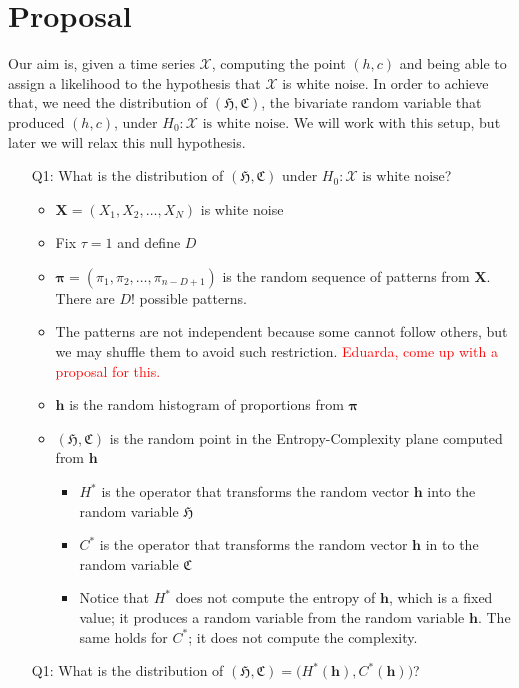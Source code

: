 \documentclass[12pt]{article}
\begin{document}
\section{Proposal}

Our aim is, given a time series $\mathcal X$, computing the point $(h,c)$ and being able to assign a likelihood to the hypothesis that $\mathcal X$ is white noise.
In order to achieve that, we need the distribution of $(\mathfrak{H},\mathfrak{C})$, the bivariate random  variable that produced $(h,c)$, under $H_0:\mathcal X\text { is white noise}$.
We will work with this setup, but later we will relax this null hypothesis.
%
\begin{itemize}
\item[Q1:] What is the distribution of $(\mathfrak{H},\mathfrak{C})$ under $H_0:\mathcal X\text { is white noise}$?
\begin{itemize}
	\item $\bm X = (X_1,X_2,\dots,X_N)$ is white noise
	\item Fix $\tau=1$ and define $D$
	\item $\bm \pi=(\pi_1,\pi_2,\dots,\pi_{n-D+1})$ is the random sequence of patterns from $\bm X$. There are $D!$ possible patterns.
	\item The patterns are not independent because some cannot follow others, but we may shuffle them to avoid such restriction. \textcolor{red}{Eduarda, come up with a proposal for this.}
	\item $\bm h$ is the random histogram of proportions from $\bm \pi$
	\item $(\mathfrak{H},\mathfrak{C})$ is the random point in the Entropy-Complexity plane computed from $\bm h$
	\begin{itemize}	
		\item $H^*$ is the operator that transforms the random vector $\bm h$ into the random variable $\mathfrak{H}$
		\item $C^*$ is the operator that transforms the random vector $\bm h$ in to the random variable $\mathfrak{C}$
		\item Notice that $H^*$ does not compute the entropy of $\bm h$, which is a fixed value; it produces a random variable from the random variable $\bm h$. The same holds for $C^*$; it does not compute the complexity.
	\end{itemize}
\end{itemize}
\item[Q1:] What is the distribution of $
	(\mathfrak{H},\mathfrak{C}) = 
	\big(H^*(\bm h),C^*(\bm h)\big)$? 

\end{itemize}
\end{document}
